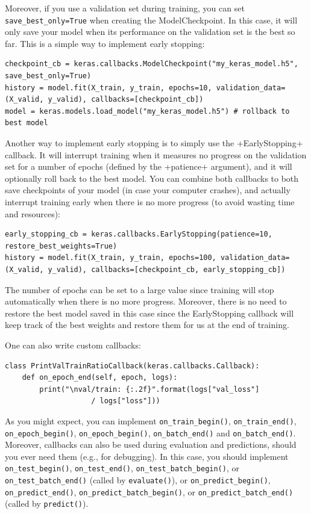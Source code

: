 Moreover, if you use a validation set during training, you can set \lstinline+save_best_only=True+ when creating the ModelCheckpoint. In this case, it will only save your model when its performance on the validation set is the best so far. This is a simple way to implement early stopping:
\begin{lstlisting}
checkpoint_cb = keras.callbacks.ModelCheckpoint("my_keras_model.h5", save_best_only=True)
history = model.fit(X_train, y_train, epochs=10, validation_data=(X_valid, y_valid), callbacks=[checkpoint_cb])
model = keras.models.load_model("my_keras_model.h5") # rollback to best model
\end{lstlisting}

Another way to implement early stopping is to simply use the \cd+EarlyStopping+ callback. It will interrupt training when it measures no progress on the validation set for a number of epochs (defined by the \cd+patience+ argument), and it will optionally roll back to the best model. You can combine both callbacks to both save checkpoints of your model (in case your computer crashes), and actually interrupt training early when there is no more progress (to avoid wasting time and resources):

\begin{lstlisting}
early_stopping_cb = keras.callbacks.EarlyStopping(patience=10, restore_best_weights=True)
history = model.fit(X_train, y_train, epochs=100, validation_data=(X_valid, y_valid), callbacks=[checkpoint_cb, early_stopping_cb])
\end{lstlisting}
The number of epochs can be set to a large value since training will stop automatically when there is no more progress. Moreover, there is no need to restore the best model saved in this case since the EarlyStopping callback will keep track of the best weights and restore them for us at the end of training.

One can also write custom callbacks:
\begin{lstlisting}
class PrintValTrainRatioCallback(keras.callbacks.Callback): 
    def on_epoch_end(self, epoch, logs):
        print("\nval/train: {:.2f}".format(logs["val_loss"] 
        			/ logs["loss"]))
\end{lstlisting}

As you might expect, you can implement \lstinline+on_train_begin()+, \lstinline+on_train_end()+, \lstinline+on_epoch_begin()+, \lstinline+on_epoch_begin()+, \lstinline+on_batch_end()+ and \lstinline+on_batch_end()+. Moreover, callbacks can also be used during evaluation and predictions, should you ever need them (e.g., for debugging). In this case, you should implement \lstinline+on_test_begin()+, \lstinline+on_test_end()+, \lstinline+on_test_batch_begin()+, or \lstinline+on_test+\lstinline+_batch+\lstinline+_end()+ (called by \lstinline+evaluate()+), or \lstinline+on_predict_begin()+, \lstinline+on_predict_end()+, \lstinline+on_+\lstinline+predict+\lstinline+_batch_begin()+, or \lstinline+on_predict_batch+\lstinline+_end()+ (called by \lstinline+predict()+).

